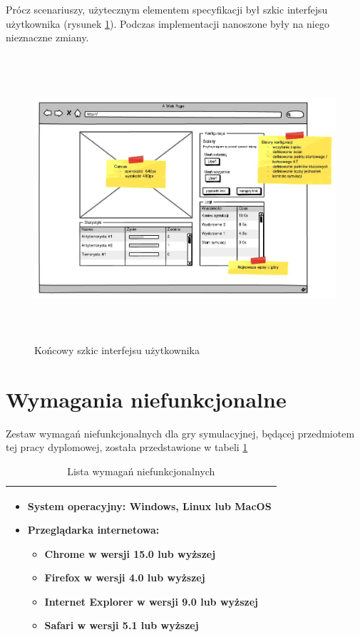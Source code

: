 Prócz scenariuszy, użytecznym elementem specyfikacji był szkic interfejsu użytkownika (rysunek \ref{wireframe}). Podczas implementacji nanoszone były na niego nieznaczne zmiany.

\begin{figure}
\begin{center}
	\includegraphics[width=160mm,height=106mm]{images/wireframe}
	\caption{Końcowy szkic interfejsu użytkownika\label{wireframe}}
\end{center}
\end{figure}

\section{Wymagania niefunkcjonalne}
Zestaw wymagań niefunkcjonalnych dla gry symulacyjnej, będącej przedmiotem tej pracy dyplomowej, została przedstawione w tabeli \ref{nonFunc}

\begin{table}
\begin{center}
\begin{tabular}{|p{}|}
\hline
	\begin{itemize}
		\setlength\itemsep{0pt}		
		\item System operacyjny: Windows, Linux lub MacOS
		\item Przeglądarka internetowa: 
			\begin{itemize}
				\item Chrome w wersji 15.0 lub wyższej
				\item Firefox w wersji 4.0 lub wyższej
				\item Internet Explorer w wersji 9.0 lub wyższej
				\item Safari w wersji 5.1 lub wyższej
			\end{itemize} 
	\end{itemize}
\\\hline
\end{tabular}
\caption {Lista wymagań niefunkcjonalnych\label{nonFunc}}
\end{center}
\end{table} 


